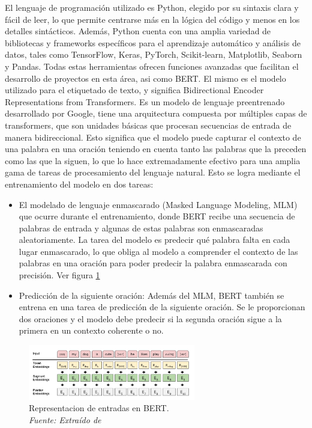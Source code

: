 El lenguaje de programación utilizado es Python, elegido por su sintaxis clara y fácil de leer, lo que permite centrarse más en la lógica del código y menos en los detalles sintácticos. Además, Python cuenta con una amplia variedad de bibliotecas y frameworks específicos para el aprendizaje automático y análisis de datos, tales como TensorFlow, Keras, PyTorch, Scikit-learn, Matplotlib, Seaborn y Pandas. Todas estas herramientas ofrecen funciones avanzadas que facilitan el desarrollo de proyectos en esta área, asi como BERT. El mismo es el modelo utilizado para el etiquetado de texto, y significa Bidirectional Encoder Representations from Transformers. Es un modelo de lenguaje preentrenado desarrollado por Google, tiene una arquitectura compuesta por múltiples capas de transformers, que son unidades básicas que procesan secuencias de entrada de manera bidireccional. Esto significa que el modelo puede capturar el contexto de una palabra en una oración teniendo en cuenta tanto las palabras que la preceden como las que la siguen, lo que lo hace extremadamente efectivo para una amplia gama de tareas de procesamiento del lenguaje natural. Esto se logra mediante el entrenamiento del modelo en dos tareas: 

\begin{itemize}
\item El modelado de lenguaje enmascarado (Masked Language Modeling, MLM) que ocurre durante el entrenamiento, donde BERT recibe una secuencia de palabras de entrada y algunas de estas palabras son enmascaradas aleatoriamente. La tarea del modelo es predecir qué palabra falta en cada lugar enmascarado, lo que obliga al modelo a comprender el contexto de las palabras en una oración para poder predecir la palabra enmascarada con precisión. Ver figura \ref{fig:nlp8}

\item Predicción de la siguiente oración: Además del MLM, BERT también se entrena en una tarea de predicción de la siguiente oración. Se le proporcionan dos oraciones y el modelo debe predecir si la segunda oración sigue a la primera en un contexto coherente o no.
\end{itemize}

\begin{figure}[h!]
	\includegraphics[width=0.65\textwidth]{capitulo3/figuras/nlp8.png}
	\caption[Representacion de entradas en BERT.]{Representacion de entradas en BERT.
		\\\textit{Fuente: Extraído de} \protect\cite[p. 5]{devlin2018bert} }
	\label{fig:nlp8}
\end{figure}

